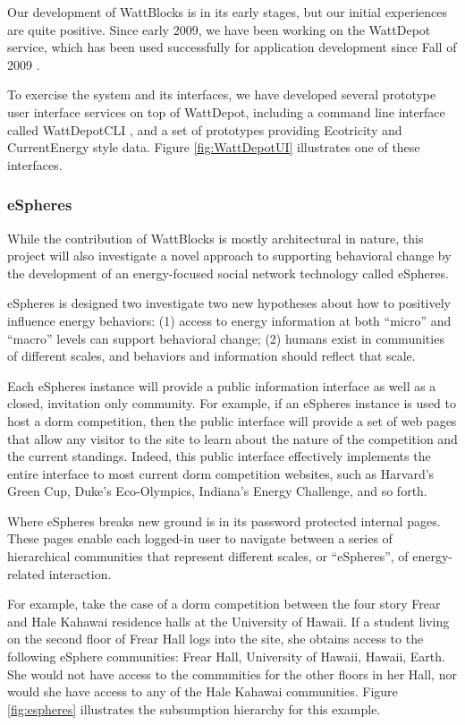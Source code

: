 Our development of WattBlocks is in its early stages, but our initial
experiences are quite positive.  Since early 2009, we have been working on
the WattDepot service, which has been used successfully for application
development since Fall of 2009 \cite{WattDepot}.  

To exercise the system
and its interfaces, we have developed several prototype user interface
services on top of WattDepot, including a command line interface called
WattDepotCLI \cite{WattDepotCLI}, and a set of prototypes providing Ecotricity and
CurrentEnergy style data.  Figure \ref{fig:WattDepotUI} illustrates one of
these interfaces.


\subsubsection{eSpheres}

While the contribution of WattBlocks is mostly architectural in nature,
this project will also investigate a novel approach to supporting
behavioral change by the development of an energy-focused social network
technology called eSpheres.

eSpheres is designed two investigate two new hypotheses about how to
positively influence energy behaviors: (1) access to energy information at
both ``micro'' and ``macro'' levels can support behavioral change; (2)
humans exist in communities of different scales, and behaviors and
information should reflect that scale.

Each eSpheres instance will provide a public information interface as well
as a closed, invitation only community.  For example, if an eSpheres
instance is used to host a dorm competition, then the public interface will
provide a set of web pages that allow any visitor to the site to learn
about the nature of the competition and the current standings.  Indeed,
this public interface effectively implements the entire interface to most
current dorm competition websites, such as Harvard's Green Cup, Duke's
Eco-Olympics, Indiana's Energy Challenge, and so forth. 

Where eSpheres breaks new ground is in its password protected internal
pages.  These pages enable each logged-in user to navigate between a series
of hierarchical communities that represent different scales, or
``eSpheres'', of energy-related interaction.

For example, take the case of a dorm competition between the four story
Frear and Hale Kahawai residence halls at the University of Hawaii. If a
student living on the second floor of Frear Hall logs into the site, she
obtains access to the following eSphere communities: Frear Hall, University
of Hawaii, Hawaii, Earth.  She would not have access to the communities for
the other floors in her Hall, nor would she have access to any of the Hale
Kahawai communities.  Figure \ref{fig:espheres} illustrates the subsumption
hierarchy for this example.


